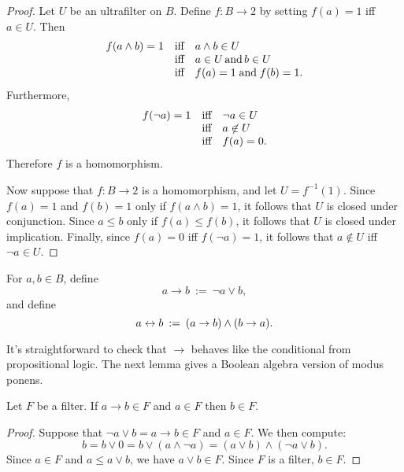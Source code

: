 \begin{proof} Let $U$ be an ultrafilter on $B$.  Define $f:B\to 2$ by
  setting $f(a)=1$ iff $a\in U$.  Then
  \[ \begin{array}{l l l}
    f(a\wedge b)=1 & \text{iff} & a\wedge b\in U \\
    & \text{iff} & a\in U \,\text{and}\,b\in U \\
    & \text{iff} & f(a)=1\; \text{and}\; f(b)=1 .\end{array}
  \] Furthermore,
  \[ \begin{array}{l l l}
    f(\neg a)=1 & \text{iff} & \neg a\in U \\
    & \text{iff} & a\not\in U  \\
    & \text{iff} & f(a)=0 .\end{array} \] Therefore $f$ is a
  homomorphism.

  Now suppose that $f:B\to 2$ is a homomorphism, and let
  $U=f^{-1}(1)$.  Since $f(a)=1$ and $f(b)=1$ only if $f(a\wedge
  b)=1$, it follows that $U$ is closed under conjunction.  Since
  $a\leq b$ only if $f(a)\leq f(b)$, it follows that $U$ is closed
  under implication.  Finally, since $f(a)=0$ iff $f(\neg a)=1$, it
  follows that $a\not\in U$ iff $\neg a\in U$. \end{proof}

\begin{defn} For $a,b\in B$, define
\[ a\to b \: := \: \neg a\vee b ,\]
and define 
\[ a\leftrightarrow b \: := \: (a\to b)\wedge (b\to a) .\] \end{defn}

It's straightforward to check that $\to$ behaves like the conditional
from propositional logic.  The next lemma gives a Boolean algebra
version of modus ponens.

\begin{lemma} Let $F$ be a filter.  If $a\to b\in F$ and $a\in F$ then
  $b\in F$.  \end{lemma}

\begin{proof} Suppose that $\neg a\vee b=a\to b\in F$ and $a\in F$.
  We then compute:
$$ b=b\vee 0=b\vee (a\wedge \neg a) = (a\vee b)\wedge (\neg a \vee b)
.$$ Since $a\in F$ and $a\leq a\vee b$, we have $a\vee b\in F$.  Since
$F$ is a filter, $b\in F$. \end{proof}


